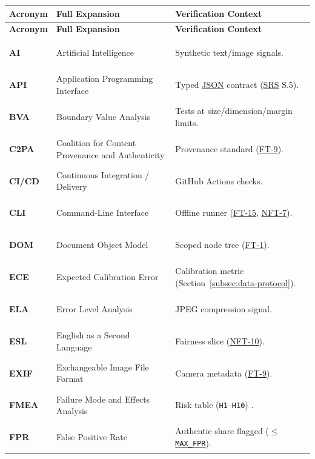 \documentclass[12pt, titlepage]{article}
\newcommand{\MaxFPR}{\hyperref[const:MAX_FPR]{\texttt{MAX\_\allowbreak{}FPR}}}
\newcommand{\JSON}{\hyperlink{vnv-acr-json}{JSON}}
\newcommand{\SRS}{\hyperlink{vnv-acr-srs}{SRS}}
\begin{document}
\begingroup\small
\renewcommand{\arraystretch}{0.95}
\setlength{\tabcolsep}{4pt}
\begin{tabularx}{\textwidth}{l P{4.8cm} Y}
\caption{Abbreviations and Acronyms} \label{TblVnVAcronyms}\\
\toprule
\textbf{Acronym} & \textbf{Full Expansion} & \textbf{Verification Context}\\
\midrule
\endfirsthead
\toprule
\textbf{Acronym} & \textbf{Full Expansion} & \textbf{Verification Context}\\
\midrule
\endhead
\bottomrule
\endfoot
\hypertarget{vnv-acr-ai}{\textbf{AI}} & Artificial Intelligence & Synthetic text/image signals.\\
\hypertarget{vnv-acr-api}{\textbf{API}} & Application Programming Interface & Typed \JSON{} contract (\SRS{} S.5).\\
\hypertarget{vnv-acr-bva}{\textbf{BVA}} & Boundary Value Analysis & Tests at size/dimension/margin limits.\\
\hypertarget{vnv-acr-c2pa}{\textbf{C2PA}} & Coalition for Content Provenance and Authenticity & Provenance standard (\hyperref[test:FT-9]{FT-9}).\\
\hypertarget{vnv-acr-cicd}{\textbf{CI/CD}} & Continuous Integration / Delivery & GitHub Actions checks.\\
\hypertarget{vnv-acr-cli}{\textbf{CLI}} & Command-Line Interface & Offline runner (\hyperref[test:FT-15]{FT-15}, \hyperref[test:NFT-7]{NFT-7}).\\
\hypertarget{vnv-acr-dom}{\textbf{DOM}} & Document Object Model & Scoped node tree (\hyperref[test:FT-1]{FT-1}).\\
\hypertarget{vnv-acr-ece}{\textbf{ECE}} & Expected Calibration Error & Calibration metric (Section~\ref{subsec:data-protocol}).\\
\hypertarget{vnv-acr-ela}{\textbf{ELA}} & Error Level Analysis & JPEG compression signal.\\
\hypertarget{vnv-acr-esl}{\textbf{ESL}} & English as a Second Language & Fairness slice (\hyperref[test:NFT-10]{NFT-10}).\\
\hypertarget{vnv-acr-exif}{\textbf{EXIF}} & Exchangeable Image File Format & Camera metadata (\hyperref[test:FT-9]{FT-9}).\\
\hypertarget{vnv-acr-fmea}{\textbf{FMEA}} & Failure Mode and Effects Analysis & Risk table (\texttt{H1}--\texttt{H10}) \cite{VerityHA2026}.\\
\hypertarget{vnv-acr-fpr}{\textbf{FPR}} & False Positive Rate & Authentic share flagged ($\le$ \MaxFPR{}).\\

\end{tabularx}
\end{document}
